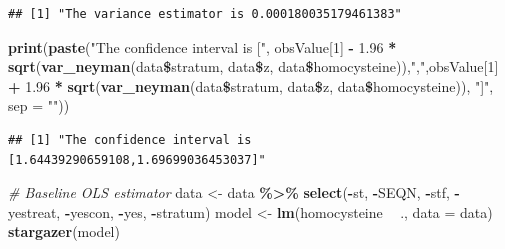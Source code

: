 \documentclass[]{article}
\newenvironment{Shaded}{\begin{snugshade}}{\end{snugshade}}
\newcommand{\KeywordTok}[1]{\textcolor[rgb]{0.13,0.29,0.53}{\textbf{#1}}}
\newcommand{\DataTypeTok}[1]{\textcolor[rgb]{0.13,0.29,0.53}{#1}}
\newcommand{\DecValTok}[1]{\textcolor[rgb]{0.00,0.00,0.81}{#1}}
\newcommand{\FloatTok}[1]{\textcolor[rgb]{0.00,0.00,0.81}{#1}}
\newcommand{\StringTok}[1]{\textcolor[rgb]{0.31,0.60,0.02}{#1}}
\newcommand{\CommentTok}[1]{\textcolor[rgb]{0.56,0.35,0.01}{\textit{#1}}}
\newcommand{\OperatorTok}[1]{\textcolor[rgb]{0.81,0.36,0.00}{\textbf{#1}}}
\newcommand{\NormalTok}[1]{#1}
\begin{document}
\begin{verbatim}
## [1] "The variance estimator is 0.000180035179461383"
\end{verbatim}

\begin{Shaded}
\begin{Highlighting}[]
\KeywordTok{print}\NormalTok{(}\KeywordTok{paste}\NormalTok{(}\StringTok{"The confidence interval is ["}\NormalTok{, obsValue[}\DecValTok{1}\NormalTok{] }\OperatorTok{-}\StringTok{ }\FloatTok{1.96} \OperatorTok{*}\StringTok{ }\KeywordTok{sqrt}\NormalTok{(}\KeywordTok{var_neyman}\NormalTok{(data}\OperatorTok{\$}\NormalTok{stratum, data}\OperatorTok{\$}\NormalTok{z, data}\OperatorTok{\$}\NormalTok{homocysteine)),}\StringTok{","}\NormalTok{,obsValue[}\DecValTok{1}\NormalTok{] }\OperatorTok{+}\StringTok{ }\FloatTok{1.96} \OperatorTok{*}\StringTok{ }\KeywordTok{sqrt}\NormalTok{(}\KeywordTok{var_neyman}\NormalTok{(data}\OperatorTok{\$}\NormalTok{stratum, data}\OperatorTok{\$}\NormalTok{z, data}\OperatorTok{\$}\NormalTok{homocysteine)), }\StringTok{"]"}\NormalTok{, }\DataTypeTok{sep =} \StringTok{""}\NormalTok{))}
\end{Highlighting}
\end{Shaded}

\begin{verbatim}
## [1] "The confidence interval is [1.64439290659108,1.69699036453037]"
\end{verbatim}

\begin{Shaded}
\begin{Highlighting}[]
\CommentTok{# Baseline OLS estimator}
\NormalTok{data <-}\StringTok{ }\NormalTok{data }\OperatorTok{\%>\%}
\StringTok{  }\KeywordTok{select}\NormalTok{(}\OperatorTok{-}\NormalTok{st, }\OperatorTok{-}\NormalTok{SEQN, }\OperatorTok{-}\NormalTok{stf, }\OperatorTok{-}\NormalTok{yestreat, }\OperatorTok{-}\NormalTok{yescon, }\OperatorTok{-}\NormalTok{yes, }\OperatorTok{-}\NormalTok{stratum)}
\NormalTok{model <-}\StringTok{ }\KeywordTok{lm}\NormalTok{(homocysteine }\OperatorTok{~}\StringTok{ }\NormalTok{., }\DataTypeTok{data =}\NormalTok{ data)}
\KeywordTok{stargazer}\NormalTok{(model)}
\end{Highlighting}
\end{Shaded}
\end{document}
